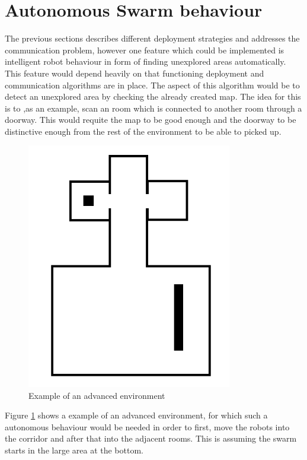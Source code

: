 \section{Autonomous Swarm behaviour}
The previous sections describes different deployment strategies and addresses the communication problem, however one feature which could be implemented is intelligent robot behaviour in form of finding unexplored areas automatically. \\
This feature would depend heavily on that functioning deployment and communication algorithms are in place. The aspect of this algorithm would be to detect an unexplored area by checking the already created map. The idea for this is to ,as an example, scan an room which is connected to another room through a doorway. This would requite the map to be good enough and the doorway to be distinctive enough from the rest of the environment to be able to picked up. \\

\begin{figure}[h]
\centering
\includegraphics[width = 0.8\textwidth]{../../figures/environment_example} 
\caption{Example of an advanced environment}
\label{environment_example}
\end{figure}

Figure \ref{environment_example} shows a example of an advanced environment, for which such a autonomous behaviour would be needed in order to first, move the robots into the corridor and after that into the adjacent rooms. This is assuming the swarm starts in the large area at the bottom. \\



